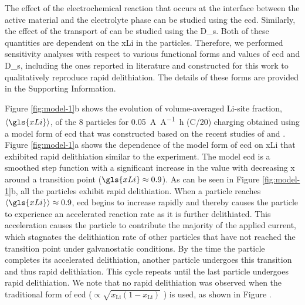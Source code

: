 \documentclass{article}
\begin{document}
The effect of the electrochemical reaction that occurs at the
interface between the active material and the electrolyte phase can be
studied using the \gls{ecd}. Similarly, the effect of the transport of
 can be studied using the \gls{D_s}. Both of these quantities
are dependent on the \gls{xLi} in the particles. Therefore, we
performed sensitivity analyses with respect to various functional
forms and values of \gls{ecd} and \gls{D_s}, including the ones
reported in literature and constructed for this work to
qualitatively reproduce rapid delithiation. The details of these forms
are provided in the Supporting Information.

Figure \ref{fig:model-1}b shows the evolution of volume-averaged
Li-site fraction, $\left\langle \gls{xLi} \right\rangle$, of the 8
particles for \SI{0.05}{\ampere\per\ampere\hour} (C/20) charging
obtained using a model form of \gls{ecd} that was constructed based on
the recent studies of \nca{} \cite{chueh2021} and \nmc{} \cite{tsai2018,
  mukherjee2017, chiang2020}. Figure \ref{fig:model-1}a shows the
dependence of the model form of \gls{ecd} on \gls{xLi} that exhibited
rapid delithiation similar to the experiment. The model \gls{ecd} is a
smoothed step function with a significant increase in the value with
decreasing x around a transition point ($\gls{xLi}\approx0.9$). As can
be seen in Figure \ref{fig:model-1}b, all the particles exhibit rapid
delithiation. When a particle reaches $\left\langle \gls{xLi}
\right\rangle\approx0.9$, \gls{ecd} begins to increase rapidly and
thereby causes the particle to experience an accelerated reaction rate
as it is further delithiated. This acceleration causes the particle to
contribute the majority of the applied current, which stagnates the
delithiation rate of other particles that have not reached the
transition point under galvanostatic conditions. By the time the
particle completes its accelerated delithiation, another particle
undergoes this transition and thus rapid delithiation. This cycle
repeats until the last particle undergoes rapid delithiation.  We note
that no rapid delithiation was observed when the traditional form of
\gls{ecd} ($\propto\sqrt{{x_{\textrm{Li}}}(1-{x_{\textrm{Li}}})}$
\cite{newman1993, newman1994, newman1995, newman1996}) is used, as
shown in Figure .
\end{document}
